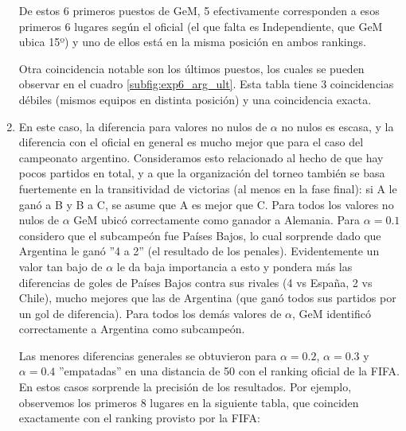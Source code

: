 \begin{enumerate}[parsep=1ex]
        \par De estos 6 primeros puestos de GeM, 5 efectivamente corresponden a
        esos primeros 6 lugares según el oficial (el que falta es Independiente,
        que GeM ubica 15º) y uno de ellos está en la misma posición en ambos
        rankings.

        \par Otra coincidencia notable son los últimos puestos, los cuales se
        pueden observar en el cuadro \ref{subfig:exp6_arg_ult}. Esta tabla tiene
        3 coincidencias débiles (mismos equipos en distinta posición) y una
        coincidencia exacta.\\

    \item En este caso, la diferencia para valores no nulos de $\alpha$ no nulos
        es escasa, y la diferencia con el oficial en general es mucho mejor que
        para el caso del campeonato argentino. Consideramos esto relacionado al
        hecho de que hay pocos partidos en total, y a que la organización del
        torneo también se basa fuertemente en la transitividad de victorias (al
        menos en la fase final): si A le ganó a B y B a C, se asume que A es
        mejor que C.  Para todos los valores no nulos de $\alpha$ GeM ubicó
        correctamente como ganador a Alemania. Para $\alpha=0.1$ considero que
        el subcampeón fue Países Bajos, lo cual sorprende dado que Argentina le
        ganó ''4 a 2'' (el resultado de los penales). Evidentemente un valor tan
        bajo de $\alpha$ le da baja importancia a esto y pondera más las
        diferencias de goles de Países Bajos contra sus rivales (4 vs España, 2
        vs Chile), mucho mejores que las de Argentina (que ganó todos sus
        partidos por un gol de diferencia). Para todos los demás valores de
        $\alpha$, GeM identificó correctamente a Argentina como subcampeón.

        \par Las menores diferencias generales se obtuvieron para $\alpha=0.2$,
        $\alpha=0.3$ y $\alpha=0.4$ ''empatadas'' en una distancia de 50 con el
        ranking oficial de la FIFA. En estos casos sorprende la precisión de los
        resultados. Por ejemplo, observemos los primeros 8 lugares en la
        siguiente tabla, que coinciden exactamente con el ranking provisto por
        la FIFA:


\end{enumerate}
